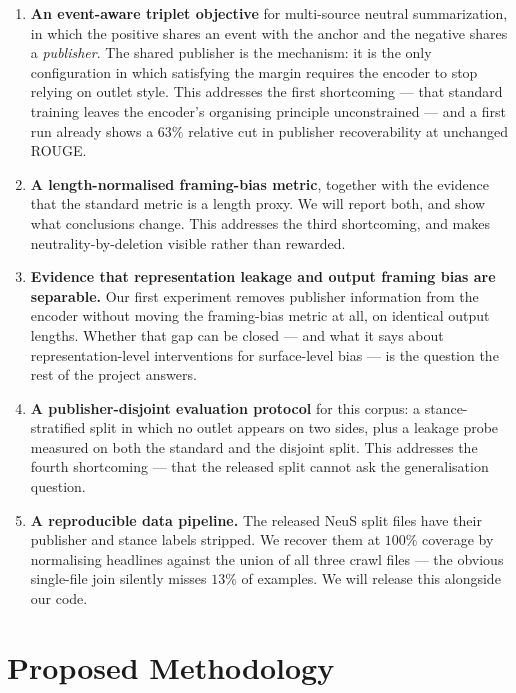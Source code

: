 \documentclass[10pt,twocolumn,a4paper]{article}
\begin{document}
\begin{enumerate}\itemsep2pt
\item \textbf{An event-aware triplet objective} for multi-source neutral
summarization, in which the positive shares an event with the anchor and the
negative shares a \emph{publisher}. The shared publisher is the mechanism: it is
the only configuration in which satisfying the margin requires the encoder to
stop relying on outlet style. This addresses the first shortcoming --- that
standard training leaves the encoder's organising principle unconstrained ---
and a first run already shows a $63\%$ relative cut in publisher recoverability
at unchanged ROUGE.

\item \textbf{A length-normalised framing-bias metric}, together with the
evidence that the standard metric is a length proxy. We will report both, and
show what conclusions change. This addresses the third shortcoming, and makes
neutrality-by-deletion visible rather than rewarded.

\item \textbf{Evidence that representation leakage and output framing bias are
separable.} Our first experiment removes publisher information from the encoder
without moving the framing-bias metric at all, on identical output lengths.
Whether that gap can be closed --- and what it says about representation-level
interventions for surface-level bias --- is the question the rest of the project
answers.

\item \textbf{A publisher-disjoint evaluation protocol} for this corpus: a
stance-stratified split in which no outlet appears on two sides, plus a leakage
probe measured on both the standard and the disjoint split. This addresses the
fourth shortcoming --- that the released split cannot ask the generalisation
question.

\item \textbf{A reproducible data pipeline.} The released NeuS split files have
their publisher and stance labels stripped. We recover them at $100\%$ coverage
by normalising headlines against the union of all three crawl files --- the
obvious single-file join silently misses $13\%$ of examples. We will release
this alongside our code.
\end{enumerate}

\section{Proposed Methodology}
\end{document}
